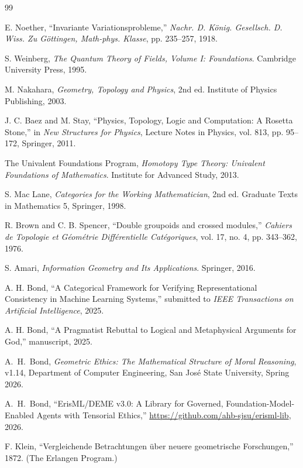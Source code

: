 \documentclass[12pt,letterpaper]{article}
\theoremstyle{definition}
\theoremstyle{remark}
\begin{document}
\begin{thebibliography}{99}

E. Noether, ``Invariante Variationsprobleme,'' \textit{Nachr. D. K\"{o}nig. Gesellsch. D. Wiss. Zu G\"{o}ttingen, Math-phys. Klasse}, pp. 235--257, 1918.

S. Weinberg, \textit{The Quantum Theory of Fields, Volume I: Foundations}. Cambridge University Press, 1995.

M. Nakahara, \textit{Geometry, Topology and Physics}, 2nd ed. Institute of Physics Publishing, 2003.

J. C. Baez and M. Stay, ``Physics, Topology, Logic and Computation: A Rosetta Stone,'' in \textit{New Structures for Physics}, Lecture Notes in Physics, vol. 813, pp. 95--172, Springer, 2011.

The Univalent Foundations Program, \textit{Homotopy Type Theory: Univalent Foundations of Mathematics}. Institute for Advanced Study, 2013.

S. Mac Lane, \textit{Categories for the Working Mathematician}, 2nd ed. Graduate Texts in Mathematics 5, Springer, 1998.

R. Brown and C. B. Spencer, ``Double groupoids and crossed modules,'' \textit{Cahiers de Topologie et G\'{e}om\'{e}trie Diff\'{e}rentielle Cat\'{e}goriques}, vol. 17, no. 4, pp. 343--362, 1976.

S. Amari, \textit{Information Geometry and Its Applications}. Springer, 2016.

A. H. Bond, ``A Categorical Framework for Verifying Representational Consistency in Machine Learning Systems,'' submitted to \textit{IEEE Transactions on Artificial Intelligence}, 2025.

A. H. Bond, ``A Pragmatist Rebuttal to Logical and Metaphysical Arguments for God,'' manuscript, 2025.

A.~H.~Bond, \emph{Geometric Ethics: The Mathematical Structure of Moral Reasoning}, v1.14, Department of Computer Engineering, San Jos\'e State University, Spring 2026.

A.~H.~Bond, ``ErisML/DEME v3.0: A Library for Governed, Foundation-Model-Enabled Agents with Tensorial Ethics,'' \url{https://github.com/ahb-sjsu/erisml-lib}, 2026.

F. Klein, ``Vergleichende Betrachtungen \"{u}ber neuere geometrische Forschungen,'' 1872. (The Erlangen Program.)


\end{thebibliography}
\end{document}
